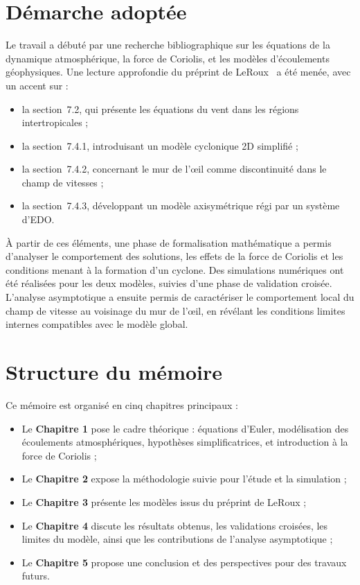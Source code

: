 \section*{D\'emarche adopt\'ee}

Le travail a d\'ebut\'e par une recherche bibliographique sur les \'equations de la dynamique atmosph\'erique, la force de Coriolis, et les mod\`eles d'\'ecoulements g\'eophysiques. Une lecture approfondie du pr\'eprint de LeRoux~\cite{leroux2014modelisation} a \'et\'e men\'ee, avec un accent sur :
\begin{itemize}
    \item la section~7.2, qui pr\'esente les \'equations du vent dans les r\'egions intertropicales ;
    \item la section~7.4.1, introduisant un mod\`ele cyclonique 2D simplifi\'e ;
    \item la section~7.4.2, concernant le mur de l'\oe il comme discontinuit\'e dans le champ de vitesses ;
    \item la section~7.4.3, d\'eveloppant un mod\`ele axisym\'etrique r\'egi par un syst\`eme d'EDO.
\end{itemize}

\`A partir de ces \'el\'ements, une phase de formalisation math\'ematique a permis d'analyser le comportement des solutions, les effets de la force de Coriolis et les conditions menant \`a la formation d'un cyclone. Des simulations num\'eriques ont \'et\'e r\'ealis\'ees pour les deux mod\`eles, suivies d'une phase de validation crois\'ee. L'analyse asymptotique a ensuite permis de caract\'eriser le comportement local du champ de vitesse au voisinage du mur de l'\oe il, en r\'ev\'elant les conditions limites internes compatibles avec le mod\`ele global.

\section*{Structure du m\'emoire}

Ce m\'emoire est organis\'e en cinq chapitres principaux :
\begin{itemize}
    \item Le \textbf{Chapitre 1} pose le cadre th\'eorique : \'equations d'Euler, mod\'elisation des \'ecoulements atmosph\'eriques, hypoth\`eses simplificatrices, et introduction \`a la force de Coriolis ;
    \item Le \textbf{Chapitre 2} expose la m\'ethodologie suivie pour l'\'etude et la simulation ;
    \item Le \textbf{Chapitre 3} pr\'esente les mod\`eles issus du pr\'eprint de LeRoux ;
    \item Le \textbf{Chapitre 4} discute les r\'esultats obtenus, les validations crois\'ees, les limites du mod\`ele, ainsi que les contributions de l'analyse asymptotique ;
    \item Le \textbf{Chapitre 5} propose une conclusion et des perspectives pour des travaux futurs.
\end{itemize}
